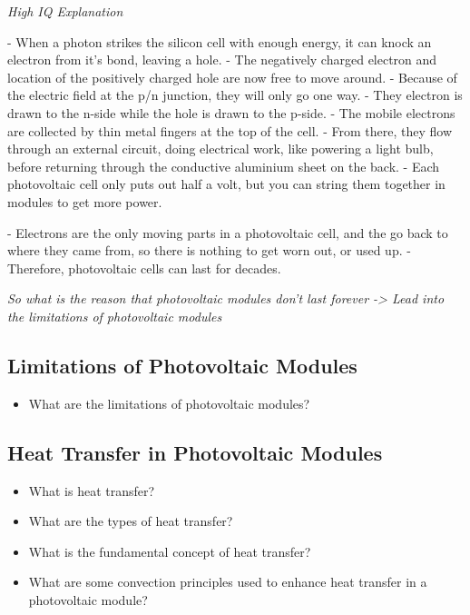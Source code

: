 \noindent\textit{High IQ Explanation}\par
\noindent - When a photon strikes the silicon cell with enough energy, it can knock an electron from it's bond, leaving a hole.
\noindent - The negatively charged electron and location of the positively charged hole are now free to move around.
\noindent - Because of the electric field at the p/n junction, they will only go one way.
\noindent - They electron is drawn to the n-side while the hole is drawn to the p-side.
\noindent - The mobile electrons are collected by thin metal fingers at the top of the cell.
\noindent - From there, they flow through an external circuit, doing electrical work, like powering a light bulb, before returning through the conductive aluminium sheet on the back.
\noindent - Each photovoltaic cell only puts out half a volt, but you can string them together in modules to get more power.

\noindent - Electrons are the only moving parts in a photovoltaic cell, and the go back to where they came from, so there is nothing to get worn out, or used up.
\noindent - Therefore, photovoltaic cells can last for decades.

\noindent \textit{So what is the reason that photovoltaic modules don't last forever -> Lead into the limitations of photovoltaic modules}






\subsection{Limitations of Photovoltaic Modules}
\begin{itemize}
    \item What are the limitations of photovoltaic modules?
\end{itemize}

\subsection{Heat Transfer in Photovoltaic Modules}
\begin{itemize}
    \item What is heat transfer?
    \item What are the types of heat transfer?
    \item What is the fundamental concept of heat transfer?
    \item What are some convection principles used to enhance heat transfer in a photovoltaic module?
\end{itemize}

